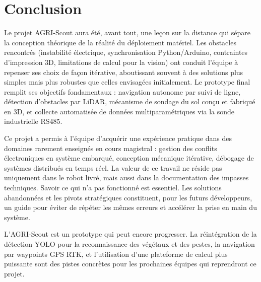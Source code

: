 \section{Conclusion}

Le projet AGRI-Scout aura été, avant tout, une leçon sur la distance qui sépare la conception théorique de la réalité du déploiement matériel. Les obstacles rencontrés (instabilité électrique, synchronisation Python/Arduino, contraintes d'impression 3D, limitations de calcul pour la vision) ont conduit l'équipe à repenser ses choix de façon itérative, aboutissant souvent à des solutions plus simples mais plus robustes que celles envisagées initialement. Le prototype final remplit ses objectifs fondamentaux : navigation autonome par suivi de ligne, détection d'obstacles par LiDAR, mécanisme de sondage du sol conçu et fabriqué en 3D, et collecte automatisée de données multiparamétriques via la sonde industrielle RS485.

Ce projet a permis à l'équipe d'acquérir une expérience pratique dans des domaines rarement enseignés en cours magistral : gestion des conflits électroniques en système embarqué, conception mécanique itérative, débogage de systèmes distribués en temps réel. La valeur de ce travail ne réside pas uniquement dans le robot livré, mais aussi dans la documentation des impasses techniques. Savoir ce qui n'a pas fonctionné est essentiel. Les solutions abandonnées et les pivots stratégiques constituent, pour les futurs développeurs, un guide pour éviter de répéter les mêmes erreurs et accélérer la prise en main du système.

L'AGRI-Scout est un prototype qui peut encore progresser. La réintégration de la détection YOLO pour la reconnaissance des végétaux et des pestes, la navigation par waypoints GPS RTK, et l'utilisation d'une plateforme de calcul plus puissante sont des pistes concrètes pour les prochaines équipes qui reprendront ce projet.
